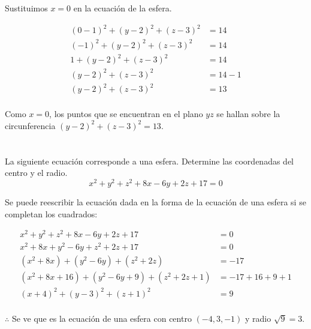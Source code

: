 \documentclass[12pt]{article}
\begin{document}
\begin{enumerate}[format=\textbf]
  Sustituimos $x = 0$ en la ecuación de la esfera.
  
  \begin{align*}
    (0-1)^2 + (y-2)^2 + (z-3)^2
    &= 14 \\
    (-1)^2 + (y-2)^2 + (z-3)^2
    &= 14 \\
    1 + (y-2)^2 + (z-3)^2
    &= 14 \\
    (y-2)^2 + (z-3)^2
    &= 14 - 1 \\
    (y-2)^2 + (z-3)^2
    &= 13 \\
  \end{align*}
  
  Como $x = 0$, los puntos que se encuentran en el plano $yz$ se hallan sobre la circunferencia $(y-2)^2 + (z-3)^2 = 13$.
  
\end{enumerate}

\section{}

La siguiente ecuación corresponde a una esfera. Determine las coordenadas del centro y el radio.
\[ x^2 + y^2 + z^2 + 8x - 6y + 2z + 17 = 0 \]

Se puede reescribir la ecuación dada en la forma de la ecuación de una esfera si se completan los cuadrados:

\begin{equation*}
  \begin{split}
    x^2 + y^2 + z^2 + 8x - 6y + 2z + 17 &= 0 \\
    x^2 + 8x + y^2 - 6y + z^2 + 2z + 17 &= 0 \\
    (x^2 + 8x) + (y^2 - 6y) + (z^2 + 2z) &= - 17 \\
    (x^2 + 8x + 16) + (y^2 - 6y + 9) + (z^2 + 2z + 1) &= - 17 + 16 + 9 + 1\\
    (x + 4)^2 + (y - 3)^2 + (z + 1)^2 &= 9 \\
  \end{split}
\end{equation*}

$\therefore $ Se ve que es la ecuación de una esfera con centro $(-4, 3, -1)$ y radio $\sqrt{9} = 3$.

\section{}
\end{document}
